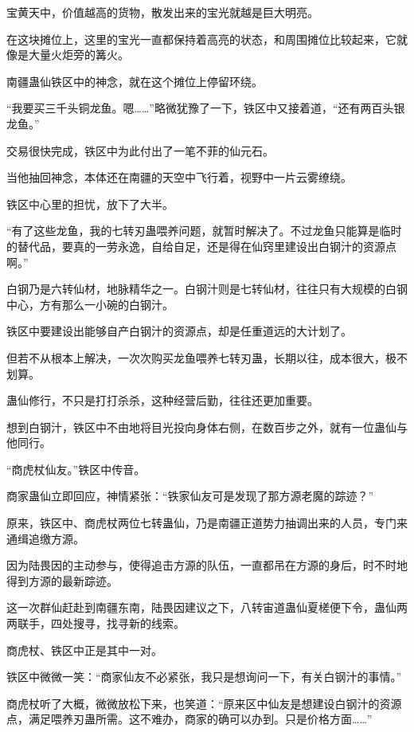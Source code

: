 
\begin{this_body}



宝黄天中，价值越高的货物，散发出来的宝光就越是巨大明亮。

在这块摊位上，这里的宝光一直都保持着高亮的状态，和周围摊位比较起来，它就像是大量火炬旁的篝火。

南疆蛊仙铁区中的神念，就在这个摊位上停留环绕。

“我要买三千头铜龙鱼。嗯……”略微犹豫了一下，铁区中又接着道，“还有两百头银龙鱼。”

交易很快完成，铁区中为此付出了一笔不菲的仙元石。

当他抽回神念，本体还在南疆的天空中飞行着，视野中一片云雾缭绕。

铁区中心里的担忧，放下了大半。

“有了这些龙鱼，我的七转刃蛊喂养问题，就暂时解决了。不过龙鱼只能算是临时的替代品，要真的一劳永逸，自给自足，还是得在仙窍里建设出白钢汁的资源点啊。”

白钢乃是六转仙材，地脉精华之一。白钢汁则是七转仙材，往往只有大规模的白钢中心，方有那么一小碗的白钢汁。

铁区中要建设出能够自产白钢汁的资源点，却是任重道远的大计划了。

但若不从根本上解决，一次次购买龙鱼喂养七转刃蛊，长期以往，成本很大，极不划算。

蛊仙修行，不只是打打杀杀，这种经营后勤，往往还更加重要。

想到白钢汁，铁区中不由地将目光投向身体右侧，在数百步之外，就有一位蛊仙与他同行。

“商虎杖仙友。”铁区中传音。

商家蛊仙立即回应，神情紧张：“铁家仙友可是发现了那方源老魔的踪迹？”

原来，铁区中、商虎杖两位七转蛊仙，乃是南疆正道势力抽调出来的人员，专门来通缉追缴方源。

因为陆畏因的主动参与，使得追击方源的队伍，一直都吊在方源的身后，时不时地得到方源的最新踪迹。

这一次群仙赶赴到南疆东南，陆畏因建议之下，八转宙道蛊仙夏槎便下令，蛊仙两两联手，四处搜寻，找寻新的线索。

商虎杖、铁区中正是其中一对。

铁区中微微一笑：“商家仙友不必紧张，我只是想询问一下，有关白钢汁的事情。”

商虎杖听了大概，微微放松下来，也笑道：“原来区中仙友是想建设白钢汁的资源点，满足喂养刃蛊所需。这不难办，商家的确可以办到。只是价格方面……”


\end{this_body}
